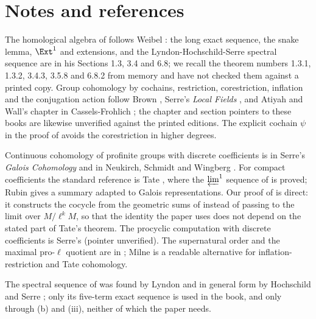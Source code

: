 \section{Notes and references}\label{sec:cohomology:notes}

The homological algebra of  follows Weibel \cite{Weibel}: the long exact sequence, the snake lemma, $\Ext^1$ and
extensions, and the Lyndon-Hochschild-Serre spectral sequence are in his Sections 1.3, 3.4 and 6.8; we recall the theorem numbers 1.3.1, 1.3.2, 3.4.3, 3.5.8 and 6.8.2
from memory and have not checked them against a printed copy. Group cohomology by cochains, restriction, corestriction, inflation and the conjugation action
follow Brown \cite[Chapters III to VI]{Brown}, Serre's \emph{Local Fields} \cite[Chapters VII and VIII]{SerreLocalFields}, and Atiyah and Wall's chapter in
Cassels-Frohlich \cite[Chapter IV]{CasselsFrohlich}; the chapter and section pointers to these books are likewise unverified against the printed editions. The
explicit cochain $\psi$ in the proof of  avoids the corestriction in higher degrees.

Continuous cohomology of profinite groups with discrete coefficients is in Serre's \emph{Galois Cohomology} \cite[Chapter I]{SerreGaloisCoh} and in
Neukirch, Schmidt and Wingberg \cite[Chapters I and II]{NSW}. For compact coefficients the standard reference is Tate \cite[Section 2]{Tate95}, where the
$\varprojlim^1$ sequence of  is proved; Rubin \cite[Appendix B]{Rubin} gives a summary adapted to Galois representations. Our proof
of  is direct: it constructs the cocycle from the geometric sums of  instead of passing to
the limit over $M/\ell^kM$, so that the identity the paper uses does not depend on the stated part of Tate's theorem. The procyclic computation with discrete
coefficients is Serre's \cite[Chapter XIII, Section 1]{SerreLocalFields} (pointer unverified). The supernatural order and the maximal pro-$\ell$ quotient are in
\cite[Chapter I, Section 1]{SerreGaloisCoh}; Milne \cite[Chapter II]{MilneCFT} is a readable alternative for inflation-restriction and Tate cohomology.

The spectral sequence of  was found by Lyndon \cite{Lyndon48} and in general form by Hochschild and Serre \cite{HochschildSerre53};
only its five-term exact sequence is used in the book, and only through (b) and (iii), neither of
which the paper needs.

